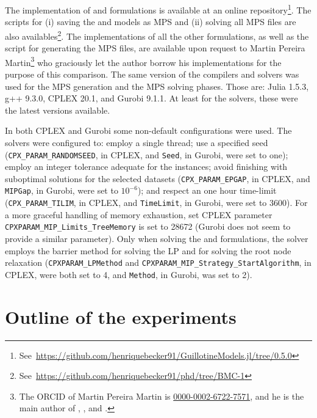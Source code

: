 The implementation of {\modelBecker} and {\modelFMT} formulations is available at an online repository\footnote{See~\url{https://github.com/henriquebecker91/GuillotineModels.jl/tree/0.5.0}}.
The scripts for (i) saving the {\modelBecker} and {\modelFMT} models as MPS and (ii) solving all MPS files are also availables\footnote{See~\url{https://github.com/henriquebecker91/phd/tree/BMC-1}}.
The implementations of all the other formulations, as well as the script for generating the MPS files, are available upon request to Martin Pereira Martin\footnote{The ORCID of Martin Pereira Martin is \href{https://orcid.org/0000-0002-6722-7571}{0000-0002-6722-7571}, and he is the main author of \citet{martin:2020}, \citet{martin:2020:bottom}, and \citet{martin:2020:top}.} who graciously let the author borrow his implementations for the purpose of this comparison. %
The same version of the compilers and solvers was used for the MPS generation and the MPS solving phases.
Those are: Julia 1.5.3, g++ 9.3.0, CPLEX 20.1, and Gurobi 9.1.1.
At least for the solvers, these were the latest versions available.

In both CPLEX and Gurobi some non-default configurations were used.
The solvers were configured to:
employ a single thread;
use a specified seed (\texttt{CPX\_PARAM\_RANDOMSEED}, in CPLEX, and \texttt{Seed}, in Gurobi, were set to one);
employ an integer tolerance adequate for the instances; avoid finishing with suboptimal solutions for the selected datasets (\texttt{CPX\_PARAM\_EPGAP}, in CPLEX, and \texttt{MIPGap}, in Gurobi, were set to \(10^{-6}\));
and respect an one hour time-limit (\texttt{CPX\_PARAM\_TILIM}, in CPLEX, and \texttt{TimeLimit}, in Gurobi, were set to 3600). For a more graceful handling of memory exhaustion, set CPLEX parameter \texttt{CPXPARAM\_MIP\_Limits\_TreeMemory} is set to 28672 (Gurobi does not seem to provide a similar parameter).
Only when solving the {\modelFMT} and {\modelBecker} formulations, the solver employs the barrier method for solving the LP and for solving the root node relaxation (\texttt{CPXPARAM\_LPMethod} and \texttt{CPXPARAM\_MIP\_Strategy\_StartAlgorithm}, in CPLEX, were both set to 4, and \texttt{Method}, in Gurobi, was set to 2).

\section{Outline of the experiments}
\label{sec:outine_experiments_other_formulations}

